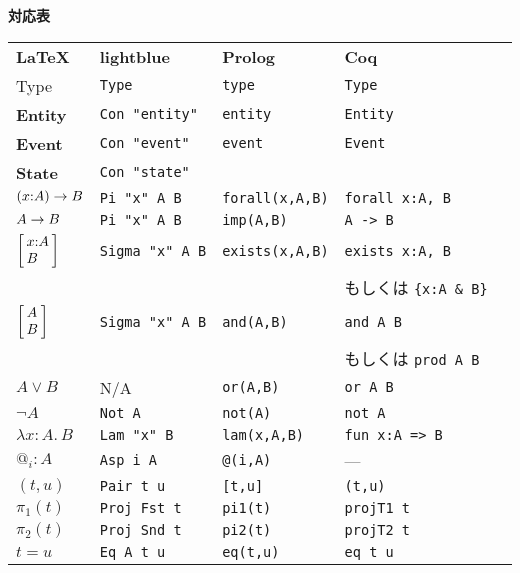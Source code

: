 \documentclass{article}
\newcommand{\dPi}[3][x]{\ensuremath{%
  \left( 
  #1{:}#2 
  \right) \to #3
  }}
\newcommand{\dSigma}[3][x]{\ensuremath{%
  \left[\kern-0.3em
  \begin{array}{l}
  #1{:}#2 \\
  #3
  \end{array}
  \kern-0.3em\right]
  }}
\newcommand{\dConj}[3][x]{\ensuremath{%
  \left[\kern-0.3em
  \begin{array}{l}
  #2 \\
  #3
  \end{array}
  \kern-0.3em\right]
  }}
\newcommand{\dImp}[3][x]{\ensuremath{%
  #2 \to #3
  }}
\begin{document}
\large

\begin{center}
{\Large\textbf{対応表}}
\end{center}

\bigskip

\begin{tabular}{lllll}
\medskip
\textbf{\LaTeX} & \textbf{lightblue} & \textbf{Prolog} & \textbf{Coq} \\
\medskip
Type & \verb|Type| & \verb|type| & \verb|Type| \\
\medskip
\textbf{Entity} & \verb|Con "entity"| & \verb|entity| & \verb|Entity| \\
\medskip
\textbf{Event} & \verb|Con "event"| & \verb|event| & \verb|Event| \\
\medskip
\textbf{State} & \verb|Con "state"| &  &  \\
\medskip
$\dPi[x]{A}{B}$ & \verb|Pi "x" A B| & \verb|forall(x,A,B)|  & \verb|forall x:A, B| &\\
\medskip
$\dImp[x]{A}{B}$ & \verb|Pi "x" A B| & \verb|imp(A,B)|  & \verb|A -> B| &\\
\medskip
$\dSigma[x]{A}{B}$ & \verb|Sigma "x" A B| & \verb|exists(x,A,B)| & \verb|exists x:A, B| &\\
\medskip
                               &  &                                & {\normalsize もしくは} \verb|{x:A & B}| \\
\medskip
$\dConj{A}{B}$ & \verb|Sigma "x" A B| & \verb|and(A,B)| & \verb|and A B| &\\
\medskip
                               &  &                                & {\normalsize もしくは} \verb|prod A B| \\
\medskip
$A \vee B$ & N/A & \verb|or(A,B)| & \verb|or A B| &\\
\medskip
$\neg A$ & \verb|Not A| & \verb|not(A)| & \verb|not A| &\\
\medskip
$\lambda x : A.\, B$ & \verb|Lam "x" B| & \verb|lam(x,A,B)| & \verb|fun x:A => B| &\\
\medskip
$@_i : A$ & \verb|Asp i A| & \verb|@(i,A)| & --- &\\
\medskip
$(t, u)$ & \verb|Pair t u| & \verb|[t,u]| & \verb|(t,u)| &\\
\medskip
$\pi_1(t)$ & \verb|Proj Fst t| & \verb|pi1(t)| & \verb|projT1 t| &\\
\medskip
$\pi_2(t)$ & \verb|Proj Snd t| & \verb|pi2(t)| & \verb|projT2 t| &\\
\medskip
$t = u$ & \verb|Eq A t u| & \verb|eq(t,u)| & \verb|eq t u| &\\

\end{tabular}
\end{document}
